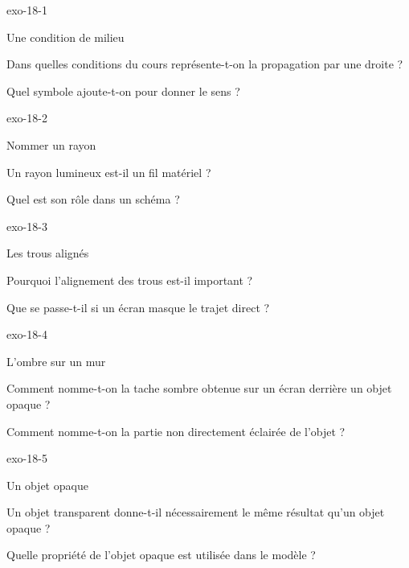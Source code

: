 \documentclass[12pt,twoside,openany]{book}
\begin{document}
\clearpage{}
\begin{blocLivre}{exo-18-1}
\begin{exercice}[1]{Une condition de milieu}
\begin{questions}
\item Dans quelles conditions du cours représente-t-on la propagation par une droite ?
\item Quel symbole ajoute-t-on pour donner le sens ?
\end{questions}
\end{exercice}\end{blocLivre}
\begin{blocLivre}{exo-18-2}
\begin{exercice}[1]{Nommer un rayon}
\begin{questions}
\item Un rayon lumineux est-il un fil matériel ?
\item Quel est son rôle dans un schéma ?
\end{questions}
\end{exercice}\end{blocLivre}
\begin{blocLivre}{exo-18-3}
\begin{exercice}[1]{Les trous alignés}
\begin{questions}
\item Pourquoi l’alignement des trous est-il important ?
\item Que se passe-t-il si un écran masque le trajet direct ?
\end{questions}
\end{exercice}\end{blocLivre}
\begin{blocLivre}{exo-18-4}
\begin{exercice}[1]{L’ombre sur un mur}
\begin{questions}
\item Comment nomme-t-on la tache sombre obtenue sur un écran derrière un objet opaque ?
\item Comment nomme-t-on la partie non directement éclairée de l’objet ?
\end{questions}
\end{exercice}\end{blocLivre}
\begin{blocLivre}{exo-18-5}
\begin{exercice}[1]{Un objet opaque}
\begin{questions}
\item Un objet transparent donne-t-il nécessairement le même résultat qu’un objet opaque ?
\item Quelle propriété de l’objet opaque est utilisée dans le modèle ?
\end{questions}
\end{exercice}\end{blocLivre}
\end{document}
